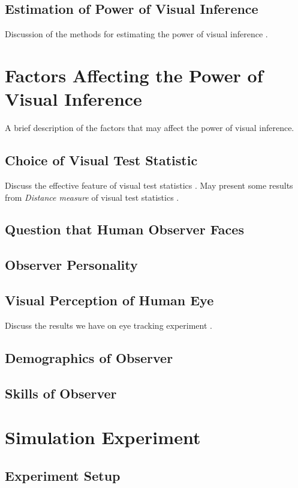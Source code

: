 \documentclass[10pt]{article}
\begin{document}
\subsection{Estimation of Power of Visual Inference} Discussion of the methods for estimating the power of visual inference \citep{majumder:2012}. 

\section{Factors Affecting the Power of Visual Inference} A brief description of the factors that may affect the power of visual inference.

\subsection{Choice of Visual Test Statistic} Discuss the effective feature of visual test statistics \citep{heike:2012}. May present some results from \textit{Distance measure} of visual test statistics \citep{niladri:2012}.
\subsection{Question that Human Observer Faces}
\subsection{Observer Personality}
\subsection{Visual Perception of Human Eye} Discuss the results we have on eye tracking experiment \citep{zhao:2012}.
\subsection{Demographics of Observer}
\subsection{Skills of Observer}

\section{Simulation Experiment}

\subsection{Experiment Setup}
\end{document}
